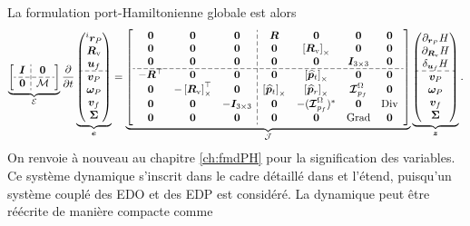 La formulation port-Hamiltonienne globale est alors
\begin{equation*}
\setlength{\dashlinegap}{2pt}
\underbrace{
	{\left[ \begin{array}{c:c}
		\bm{I} & \bm{0} \\
		\hdashline
		\bm{0} & \mathcal{M} \\
		\end{array} \right]}
}_{\mathcal{E}}
\diffp{}{t}
\underbrace{
	\begin{pmatrix}
	^i \bm{r}_P \\ \bm{R}_{\text{v}} \\ \bm{u}_f \\\hdashline  \bm{v}_P \\ \bm\omega_P  \\ \bm{v}_f  \\ \bm\Sigma \\
	\end{pmatrix}
}_{\bm{e}} = 
\underbrace{
	{\left[ \begin{array}{ccc:cccc}
		\bm{0} & \bm{0} & \bm{0} &  \bm{R} & \bm{0} & \bm{0} & \bm{0} \\
		\bm{0} & \bm{0} & \bm{0} & \bm{0} & \crmat{\bm{R}_{\text{v}}} & \bm{0} & \bm{0} \\
		\bm{0} & \bm{0} & \bm{0} & \bm{0} & \bm{0} & \bm{I}_{3\times 3} & \bm{0}  \\ 
		\hdashline
		-\bm{R}^\top & \bm{0} & \bm{0} & \bm{0} & \crmat{\widehat{\bm{p}}_t} & \bm{0} & \bm{0} \\
		\bm{0} & -\crmat{\bm{R}_{\text{v}}}^\top & \bm{0} & \crmat{\widehat{\bm{p}}_t} & \crmat{\widehat{\bm{p}}_r} & \bm{\mathcal{I}}_{p_f}^\Omega & \bm{0} \\
		\bm{0} & \bm{0} & -\bm{I}_{3\times 3} & \bm{0} & -(\bm{\mathcal{I}}_{p_f}^\Omega)^* & \bm{0} & \Div \\
		\bm{0} & \bm{0} & \bm{0} & \bm{0} & \bm{0} & \Grad & \bm{0} \\
		\end{array} \right]}
}_{\mathcal{J}}
\underbrace{\begin{pmatrix}
	\partial_{\bm{r}_P}H \\ \partial_{\bm{R}_\text{v}}H \\ \delta_{\bm{u}_f} H \\\hdashline  \bm{v}_P \\ \bm\omega_P  \\ \bm{v}_f  \\ \bm\Sigma \\
	\end{pmatrix}}_{\bm{z}}.
\end{equation*} 
On renvoie à nouveau au chapitre \ref{ch:fmdPH} pour la signification des variables. Ce système dynamique s'inscrit dans le cadre détaillé dans \cite{mehrmann2019structurepreserving} et l'étend, puisqu'un système couplé des EDO et des EDP est considéré. La dynamique peut être réécrite de manière compacte comme

